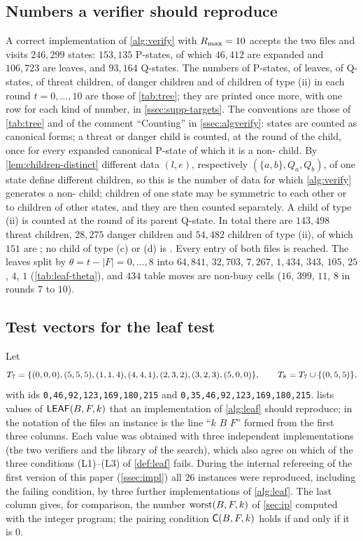 \subsection{Numbers a verifier should reproduce}\label{ssec:fmt-targets}

A correct implementation of \cref{alg:verify} with $R_{\max}=10$ accepts the two files and visits
$246{,}299$ states: $153{,}135$ P-states, of which $46{,}412$ are expanded and $106{,}723$ are leaves, and
$93{,}164$ Q-states. The numbers of P-states, of leaves, of Q-states, of threat children, of danger
children and of \VOID{} children of type (ii) in each round $t=0,\dots,10$ are those of \cref{tab:tree};
they are printed once more, with one row for each kind of number, in \cref{ssec:supp-targets}.
The conventions are those of \cref{tab:tree} and of the comment ``Counting'' in \cref{ssec:algverify}:
states are counted as canonical forms; a threat or danger
child is counted, at the round of the child, once for every expanded canonical P-state of which it is a
non-\VOID{} child. By \cref{lem:children-distinct} different data $(l,e)$, respectively
$(\{a,b\},Q_a,Q_b)$, of one state define different children, so this is the number of data for which
\cref{alg:verify} generates a non-\VOID{} child; children of one state may be symmetric to each other or
to children of other states, and they are then counted separately. A \VOID{} child of type (ii) is
counted at the round of its parent Q-state. In total there are $143{,}498$ threat children, $28{,}275$ danger children
and $54{,}482$ children of type (ii), of which $151$ are \VOID; no child of type (c) or (d) is \VOID. Every
entry of both files is reached. The leaves split by $\theta=t-|F|=0,\dots,8$ into
$64{,}841$, $32{,}703$, $7{,}267$, $1{,}434$, $343$, $105$, $25$, $4$, $1$ (\cref{tab:leaf-theta}), and $434$ table moves are
non-busy cells ($16$, $399$, $11$, $8$ in rounds $7$ to $10$).

\subsection{Test vectors for the leaf test}\label{ssec:fmt-leaf}

Let
\[
T_7=\{(0,0,0),(5,5,5),(1,1,4),(4,4,1),(2,3,2),(3,2,3),(5,0,0)\},\qquad
T_8=T_7\cup\{(0,5,5)\},
\]
with ids \texttt{0,46,92,123,169,180,215} and \texttt{0,35,46,92,123,169,180,215}. 
lists values of $\mathsf{LEAF}(B,F,k)$ that an implementation of \cref{alg:leaf} should reproduce; in the
notation of the files an instance is the line ``$k$ $B$ $F$'' formed from the first three columns. Each
value was obtained with three independent
implementations (the two verifiers and the library of the search), which also agree on which of the
three conditions (L1)--(L3) of \cref{def:leaf} fails. During the internal refereeing of the first version
of this paper (\cref{ssec:impl}) all $26$ instances were
reproduced, including the failing condition, by three further implementations of \cref{alg:leaf}. The last column gives, for comparison, the number
$\operatorname{worst}(B,F,k)$ of \cref{sec:ip} computed with the integer program; the pairing condition
$\mathsf{C}(B,F,k)$ holds if and only if it is $0$.

